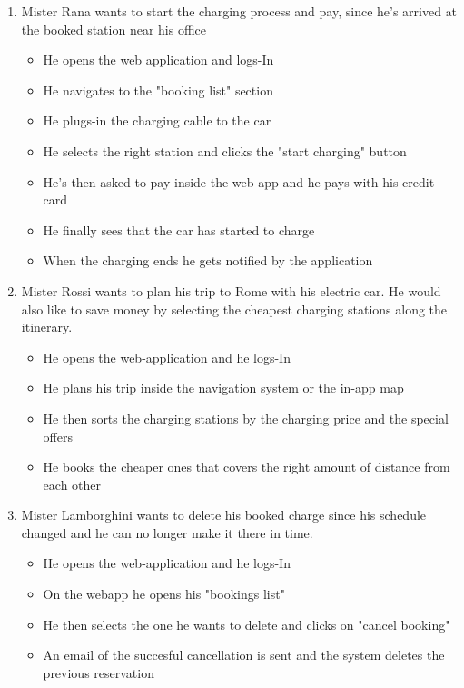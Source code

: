 \documentclass[table, 12pt]{article} %
\begin{document}
\begin{enumerate}
            \item Mister Rana wants to start the charging process and pay, since he's arrived at the booked station near his office
            \begin{itemize}
                \item He opens the web application and logs-In
                \item He navigates to the "booking list" section
                \item He plugs-in the charging cable to the car 
                \item He selects the right station and clicks the "start charging" button
                \item He's then asked to pay inside the web app and he pays with his credit card
                \item He finally sees that the car has started to charge
                \item When the charging ends he gets notified by the application
            \end{itemize}

            \item Mister Rossi wants to plan his trip to Rome with his electric car. He would also like to save money by selecting the cheapest charging stations along the itinerary.
            \begin{itemize}
                \item He opens the web-application and he logs-In
                \item He plans his trip inside the navigation system or the in-app map
                \item He then sorts the charging stations by the charging price and the special offers
                \item He books the cheaper ones that covers the right amount of distance from each other
            \end{itemize}
            
            \item Mister Lamborghini wants to delete his booked charge since his schedule changed and he can no longer make it there in time.
            \begin{itemize}
                \item He opens the web-application and he logs-In
                \item On the webapp he opens his "bookings list"
                \item He then selects the one he wants to delete and clicks on "cancel booking"
                \item An email of the succesful cancellation is sent and the system deletes the previous reservation
            \end{itemize}
            

            
            \end{enumerate}
\end{document}
